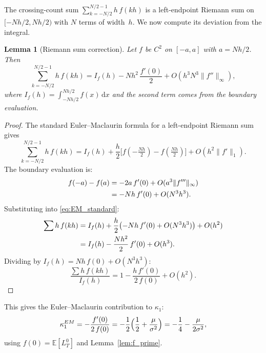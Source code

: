 \documentclass[11pt]{article}
\newtheorem{lemma}[theorem]{Lemma}
\theoremstyle{definition}
\theoremstyle{remark}
\newcommand{\E}{\mathbb{E}}
\newcommand{\dd}{\,\mathrm{d}}
\begin{document}
The crossing-count sum $\sum_{k=-N/2}^{N/2-1} h\,f(kh)$ is a
left-endpoint Riemann sum on $[-Nh/2, Nh/2)$ with $N$ terms of
width~$h$. We now compute its deviation from the integral.

\begin{lemma}[Riemann sum correction]\label{lem:EM}
Let $f$ be $C^2$ on $[-a, a]$ with $a = Nh/2$. Then
\begin{equation}\label{eq:EM_formula}
\sum_{k=-N/2}^{N/2-1} h\,f(kh)
= I_f(h) - Nh^2\,\frac{f'(0)}{2} + O(h^3 N^3 \|f''\|_\infty),
\end{equation}
where $I_f(h) = \int_{-Nh/2}^{Nh/2} f(x)\dd x$ and the second term
comes from the boundary evaluation.
\end{lemma}
\begin{proof}
The standard Euler--Maclaurin formula for a left-endpoint Riemann sum
gives
\begin{equation}\label{eq:EM_standard}
\sum_{k=-N/2}^{N/2-1} h\,f(kh)
= I_f(h) + \frac{h}{2}\bigl[f(-\tfrac{Nh}{2})
- f(\tfrac{Nh}{2})\bigr] + O(h^2 \|f'\|_1).
\end{equation}
The boundary evaluation is:
\begin{align}
f(-a) - f(a) &= -2a\,f'(0) + O(a^3\|f'''\|_\infty)
\notag \\
&= -Nh\,f'(0) + O(N^3 h^3).
\label{eq:boundary_eval}
\end{align}
Substituting into \eqref{eq:EM_standard}:
\begin{align}
\sum h\,f(kh) &= I_f(h) + \frac{h}{2}\bigl(-Nh\,f'(0)
+ O(N^3 h^3)\bigr) + O(h^2) \notag \\
&= I_f(h) - \frac{Nh^2}{2}\,f'(0) + O(h^3).
\label{eq:EM_result}
\end{align}
Dividing by $I_f(h) = Nh\,f(0) + O(N^3 h^3)$:
\begin{equation}\label{eq:sum_over_int}
\frac{\sum h\,f(kh)}{I_f(h)}
= 1 - \frac{h\,f'(0)}{2\,f(0)} + O(h^2).
\end{equation}
\end{proof}

This gives the Euler--Maclaurin contribution to $\kappa_1$:
\begin{equation}\label{eq:kappa1_EM}
\kappa_1^{EM} = -\frac{f'(0)}{2\,f(0)}
= -\frac{1}{2}\Bigl(\frac{1}{2} + \frac{\mu}{\sigma^2}\Bigr)
= -\frac{1}{4} - \frac{\mu}{2\sigma^2},
\end{equation}
using $f(0) = \E[L^0_T]$ and Lemma~\ref{lem:f_prime}.

\end{document}
